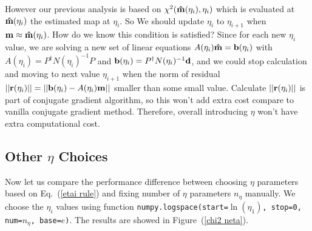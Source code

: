 \documentclass[twocolumn,linenumbers]{aastex631}
\newcommand{\vbd}{\vb{d}}
\newcommand{\vbm}{\vb{m}}
\newcommand{\vbb}{\vb{b}}
\newcommand{\inv}[1]{#1^{-1}}
\newcommand{\hatm}{\vb{\hat{m}}}
\newcommand{\Pdagger}{P^{\dagger}}
\begin{document}
However our previous analysis is based on
$\chi^2(\hatm(\eta_i), \eta_i)$ which is evaluated at 
$\hatm(\eta_i)$ the estimated map at $\eta_i$.
So We should update $\eta_i$ to $\eta_{i+1}$ when $\vbm \approx \hatm(\eta_i)$. 
How do we know this condition is satisfied?
Since for each new $\eta_i$ value, we are solving a new set of linear
equations $A(\eta_i) \hatm = \vbb(\eta_i)$ with
$A(\eta_i) = \Pdagger \inv{N(\eta_i)} P$ and 
$\vbb(\eta_i) = \Pdagger \inv{N(\eta_i)} \vbd$,
and we could stop calculation and moving to next value $\eta_{i+1}$ when the 
norm of residual 
$\qty||\vb{r}(\eta_i)|| = \qty||\vbb(\eta_i) - A(\eta_i) \vbm||$
smaller than some small value.
Calculate $\qty||\vb{r}(\eta_i)||$ is part of conjugate gradient algorithm,
so this won't add extra cost compare to vanilla conjugate gradient method.
Therefore, overall introducing $\eta$ won't have extra computational cost.


\subsection{Other $\eta$ Choices}
Now let us compare the performance difference between choosing $\eta$
parameters based on Eq.~(\ref{etai rule})
and fixing number of $\eta$ parameters $n_{\eta}$ manually.
We choose the $\eta_i$ values using function
\texttt{numpy.logspace(start=$\ln(\eta_1)$, stop=0, num=$n_{\eta}$, base=$e$)}.
The results are showed in Figure~(\ref{chi2 neta}).

%
\end{document}

